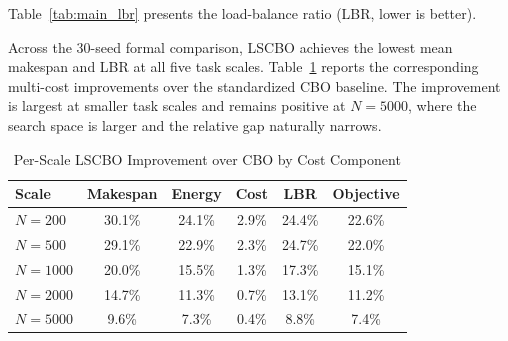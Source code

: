 \documentclass[pdflatex,onecolumn,sn-mathphys-num]{sn-jnl}
\begin{document}
Table~\ref{tab:main_lbr} presents the load-balance ratio (LBR, lower is better).

\begin{table}[ht]
\centering
\caption{Cross-Scale Load-Balance Ratio (LBR) Comparison}\label{tab:main_lbr}
\end{table}

Across the 30-seed formal comparison, LSCBO achieves the lowest mean makespan and LBR at all five task scales. Table~\ref{tab:per_scale_cbo} reports the corresponding multi-cost improvements over the standardized CBO baseline. The improvement is largest at smaller task scales and remains positive at $N=5000$, where the search space is larger and the relative gap naturally narrows.

\begin{table}[ht]
\centering
\caption{Per-Scale LSCBO Improvement over CBO by Cost Component}\label{tab:per_scale_cbo}
\begin{tabular}{l c c c c c}
\toprule
\textbf{Scale} & \textbf{Makespan} & \textbf{Energy} & \textbf{Cost} & \textbf{LBR} & \textbf{Objective} \\
\midrule
$N=200$  & 30.1\% & 24.1\% & 2.9\% & 24.4\% & 22.6\% \\
$N=500$  & 29.1\% & 22.9\% & 2.3\% & 24.7\% & 22.0\% \\
$N=1000$ & 20.0\% & 15.5\% & 1.3\% & 17.3\% & 15.1\% \\
$N=2000$ & 14.7\% & 11.3\% & 0.7\% & 13.1\% & 11.2\% \\
$N=5000$ & 9.6\%  & 7.3\%  & 0.4\% & 8.8\%  & 7.4\% \\
\bottomrule
\end{tabular}
\end{table}
\end{document}
